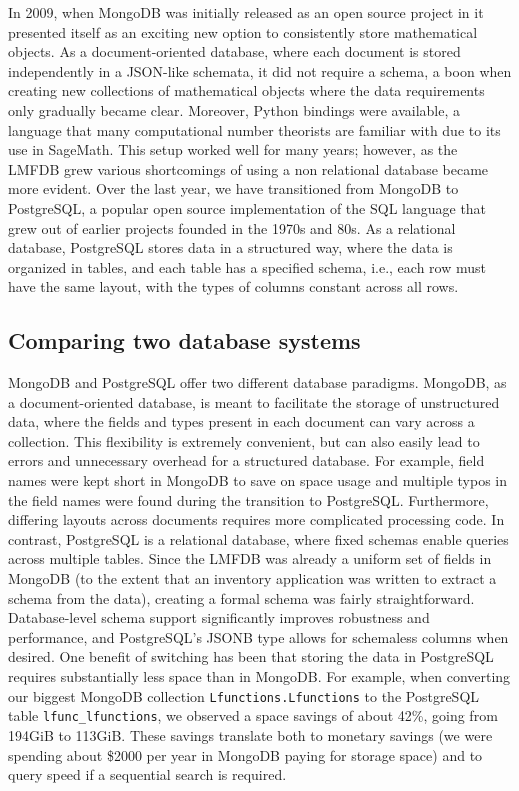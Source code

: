 \documentclass{article}
\begin{document}
In 2009, when MongoDB was initially released as an open source project in it presented itself as an exciting new option to consistently store mathematical objects.
As a document-oriented database, where each document is stored independently in a JSON-like schemata, it did not require a schema, a boon when creating new collections of mathematical objects where the data requirements only gradually became clear.
Moreover, Python bindings were available, a language that many computational number theorists are familiar with due to its use in SageMath.
This setup worked well for many years; however, as the LMFDB grew various shortcomings of using a non relational database became more evident.
Over the last year, we have transitioned from MongoDB to PostgreSQL, a popular open source implementation of the SQL language that grew out of earlier projects founded in the 1970s and 80s.
As a relational database, PostgreSQL stores data in a structured way, where the data is organized in tables, and each table has a specified schema, i.e., each row must have the same layout, with the types of columns constant across all rows.

\subsection{Comparing two database systems}

MongoDB and PostgreSQL offer two different database paradigms.
MongoDB, as a document-oriented database, is meant to facilitate the storage of unstructured data, where the fields and types present in each document can vary across a collection.
This flexibility is extremely convenient, but can also easily lead to errors and unnecessary overhead for a structured database.
For example, field names were kept short in MongoDB to save on space usage and multiple typos in the field names were found during the transition to PostgreSQL.
Furthermore, differing layouts across documents requires more complicated processing code.
In contrast, PostgreSQL is a relational database, where fixed schemas enable queries across multiple tables.
Since the LMFDB was already a uniform set of fields in MongoDB (to the extent that an inventory application was written to extract a schema from the data), creating a formal schema was fairly straightforward.
Database-level schema support significantly improves robustness and performance, and PostgreSQL's JSONB type allows for schemaless columns when desired.
One benefit of switching has been that storing the data in PostgreSQL requires substantially less space than in MongoDB.
For example, when converting our biggest MongoDB collection \texttt{Lfunctions.Lfunctions} to the PostgreSQL table \texttt{lfunc\_lfunctions}, we observed a space savings of about 42\%, going from 194GiB to 113GiB.
These savings translate both to monetary savings (we were spending about \$2000 per year in MongoDB paying for storage space) and to query speed if a sequential search is required.
\end{document}
